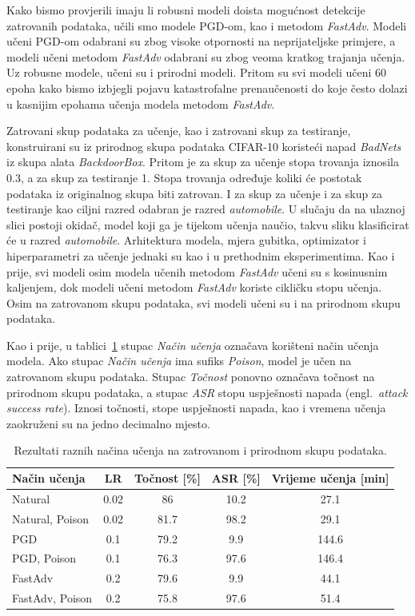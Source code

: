 \documentclass[times, utf8, zavrsni, numeric]{fer}
\begin{document}
Kako bismo provjerili imaju li robusni modeli doista mogućnost detekcije zatrovanih podataka,
učili smo modele PGD-om, kao i metodom \textit{FastAdv}. Modeli učeni PGD-om odabrani su zbog visoke otpornosti na neprijateljske primjere,
a modeli učeni metodom \textit{FastAdv} odabrani su zbog veoma kratkog trajanja učenja. Uz robusne modele, učeni su i prirodni modeli.
Pritom su svi modeli učeni 60 epoha kako bismo izbjegli pojavu katastrofalne prenaučenosti do koje često dolazi u kasnijim epohama učenja modela metodom \textit{FastAdv}. 

Zatrovani skup podataka za učenje, kao i zatrovani skup za testiranje, konstruirani su iz prirodnog skupa podataka CIFAR-10 koristeći napad \textit{BadNets} iz skupa alata \textit{BackdoorBox}. 
Pritom je za skup za učenje stopa trovanja iznosila 0.3, a za skup za testiranje 1. Stopa trovanja određuje koliki će postotak podataka iz originalnog skupa biti zatrovan.
I za skup za učenje i za skup za testiranje kao ciljni razred odabran je razred \textit{automobile}. 
U slučaju da na ulaznoj slici postoji okidač, model koji ga je tijekom učenja naučio, takvu sliku klasificirat će u razred \textit{automobile}.
Arhitektura modela, mjera gubitka, optimizator i hiperparametri za učenje jednaki su kao i u prethodnim eksperimentima. 
Kao i prije, svi modeli osim modela učenih metodom \textit{FastAdv} učeni su s kosinusnim kaljenjem, dok modeli učeni metodom \textit{FastAdv} koriste cikličku stopu učenja.
Osim na zatrovanom skupu podataka, svi modeli učeni su i na prirodnom skupu podataka.

Kao i prije, u tablici~\ref{tbl:mjerenja_robusno_ucenje_zatrovano} stupac \textit{Način učenja} označava korišteni način učenja modela. 
Ako stupac \textit{Način učenja} ima sufiks \textit{Poison}, model je učen na zatrovanom skupu podataka.
Stupac \textit{Točnost} ponovno označava točnost na prirodnom skupu podataka, a stupac \textit{ASR}
stopu uspješnosti napada (engl.\ \textit{attack success rate}). Iznosi točnosti, stope uspješnosti napada, kao i vremena učenja zaokruženi su na jedno decimalno mjesto.

\begin{table}[htb]
    \caption{Rezultati raznih načina učenja na zatrovanom i prirodnom skupu podataka.}
    \label{tbl:mjerenja_robusno_ucenje_zatrovano}
    \centering
    \begin{tabular}{lcccc} \hline
    Način učenja & LR & Točnost [\%] & ASR [\%] & Vrijeme učenja [min]\\ \hline
    Natural & 0.02 & 86 & 10.2 & 27.1 \\
    Natural, Poison & 0.02 & 81.7 & 98.2 & 29.1 \\
    PGD & 0.1 & 79.2 & 9.9 & 144.6 \\
    PGD, Poison & 0.1 & 76.3 & 97.6 & 146.4 \\
    FastAdv & 0.2 & 79.6 & 9.9 & 44.1 \\
    FastAdv, Poison & 0.2 & 75.8 & 97.6 & 51.4 \\ \hline
    \end{tabular}
\end{table}
\end{document}
